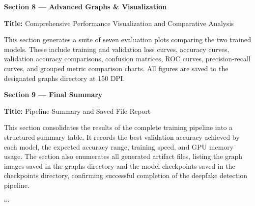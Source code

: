 \documentclass[12pt,a4paper]{report}
\begin{document}
\begin{description}
\vspace{0.5cm}

\textbf{Section 8 --- Advanced Graphs \& Visualization}

\textbf{Title:} Comprehensive Performance Visualization and Comparative Analysis

This section generates a suite of seven evaluation plots comparing the two trained models. These include training and validation loss curves, accuracy curves, validation accuracy comparisons, confusion matrices, ROC curves, precision-recall curves, and grouped metric comparison charts. All figures are saved to the designated graphs directory at 150 DPI.

\vspace{0.5cm}

\textbf{Section 9 --- Final Summary}

\textbf{Title:} Pipeline Summary and Saved File Report

This section consolidates the results of the complete training pipeline into a structured summary table. It records the best validation accuracy achieved by each model, the expected accuracy range, training speed, and GPU memory usage. The section also enumerates all generated artifact files, listing the graph images saved in the graphs directory and the model checkpoints saved in the checkpoints directory, confirming successful completion of the deepfake detection pipeline.

\end{description}
```
\end{document}
